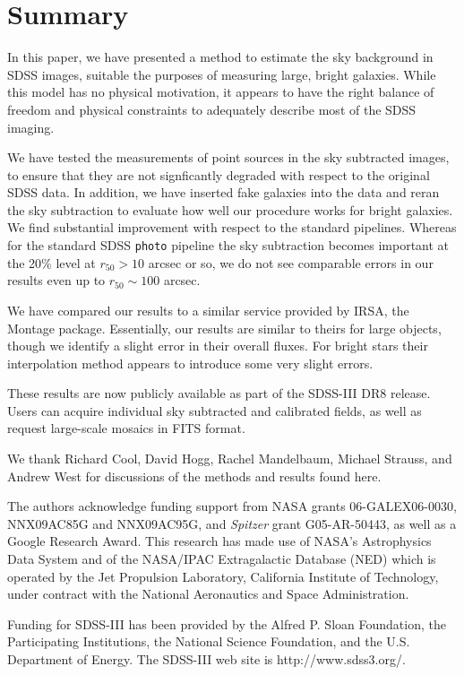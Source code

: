 \documentclass[10pt,preprint]{aastex}
\begin{document}
\section{ Summary}
\label{sec:summary}

In this paper, we have presented a method to estimate the sky
background in SDSS images, suitable the purposes of measuring large,
bright galaxies.  While this model has no physical motivation, it
appears to have the right balance of freedom and physical constraints
to adequately describe most of the SDSS imaging.

We have tested the measurements of point sources in the sky subtracted
images, to ensure that they are not signficantly degraded with respect
to the original SDSS data.  In addition, we have inserted fake
galaxies into the data and reran the sky subtraction to evaluate how
well our procedure works for bright galaxies.  We find substantial
improvement with respect to the standard pipelines.  Whereas for the
standard SDSS {\tt photo} pipeline the sky subtraction becomes
important at the 20\% level at $r_{50}>10$ arcsec or so, we do not see
comparable errors in our results even up to $r_{50} \sim 100$ arcsec.

We have compared our results to a similar service provided by IRSA,
the Montage package. Essentially, our results are similar to theirs
for large objects, though we identify a slight error in their overall
fluxes. For bright stars their interpolation method appears to
introduce some very slight errors.

These results are now publicly available as part of the SDSS-III DR8
release. Users can acquire individual sky subtracted and calibrated
fields, as well as request large-scale mosaics in FITS format.

\acknowledgments

We thank Richard Cool, David Hogg, Rachel Mandelbaum, Michael Strauss,
and Andrew West for discussions of the methods and results found here.

The authors acknowledge funding support from NASA grants
06-GALEX06-0030, NNX09AC85G and NNX09AC95G, and \emph{Spitzer} grant
G05-AR-50443, as well as a Google Research Award. This research has
made use of NASA's Astrophysics Data System and of the NASA/IPAC
Extragalactic Database (NED) which is operated by the Jet Propulsion
Laboratory, California Institute of Technology, under contract with
the National Aeronautics and Space Administration.

Funding for SDSS-III has been provided by the Alfred P. Sloan
Foundation, the Participating Institutions, the National Science
Foundation, and the U.S. Department of Energy. The SDSS-III web site
is http://www.sdss3.org/.
\end{document}
